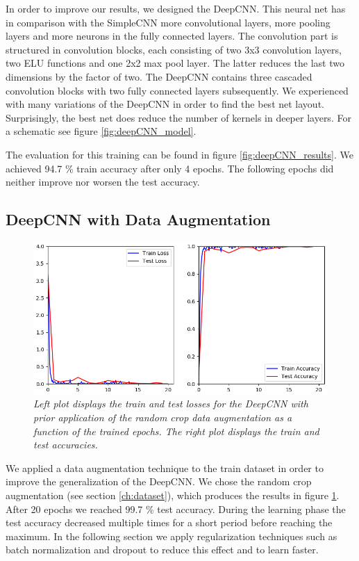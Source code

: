 \documentclass[a4paper]{article}
\begin{document}
In order to improve our results, we designed the DeepCNN. This neural net has in comparison with the SimpleCNN more convolutional layers, more pooling layers and more neurons in the fully connected layers. The convolution part is structured in convolution blocks, each consisting of two 3x3 convolution layers, two ELU functions and one 2x2 max pool layer. The latter reduces the last two dimensions by the factor of two. The DeepCNN contains three cascaded convolution blocks with two fully connected layers subsequently. We experienced with many variations of the DeepCNN in order to find the best net layout. Surprisingly, the best net does reduce the number of kernels in deeper layers. For a schematic see figure \ref{fig:deepCNN_model}. 

The evaluation for this training can be found in figure \ref{fig:deepCNN_results}. We achieved 94.7 \% train accuracy after only 4 epochs. The following epochs did neither improve nor worsen the test accuracy. 

\subsection{DeepCNN with Data Augmentation}\label{sec:deepCNN_augmented}

\begin{figure}
     \centering
     \includegraphics[height=0.25\paperwidth]{graphics/nets/CNN13_with_Augmentation_Results}
     \caption{\textit{Left plot displays the train and test losses for the DeepCNN with prior application of the random crop data augmentation as a function of the trained epochs. The right plot displays the train and test accuracies.}}
     \label{fig:deepCNN_augmented}
\end{figure}

We applied a data augmentation technique to the train dataset in order to improve the generalization of the DeepCNN. We chose the random crop augmentation (see section \ref{ch:dataset}), which produces the results in figure \ref{fig:deepCNN_augmented}. After 20 epochs we reached 99.7 \% test accuracy. During the learning phase the test accuracy decreased multiple times for a short period before reaching the maximum. In the following section we apply regularization techniques such as batch normalization and dropout to reduce this effect and to learn faster. 
\end{document}
